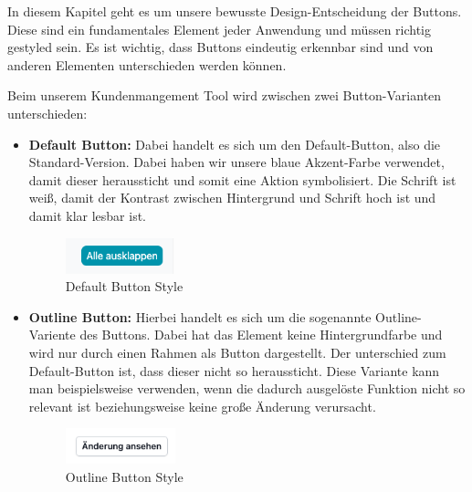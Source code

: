 In diesem Kapitel geht es um unsere bewusste Design-Entscheidung der Buttons. Diese sind ein fundamentales Element jeder Anwendung und müssen richtig gestyled sein. Es ist wichtig, dass Buttons eindeutig erkennbar sind und von anderen Elementen unterschieden werden können.

Beim unserem Kundenmangement Tool wird zwischen zwei Button-Varianten unterschieden:

\begin{itemize}
    \item \textbf{Default Button:}
        \newline
        Dabei handelt es sich um den Default-Button, also die Standard-Version. Dabei haben wir unsere blaue Akzent-Farbe verwendet, damit dieser heraussticht und somit eine Aktion symbolisiert. Die Schrift ist weiß, damit der Kontrast zwischen Hintergrund und Schrift hoch ist und damit klar lesbar ist.
        \begin{figure}[h!]
            \centering
            \includegraphics[width=0.3\textwidth]{pics/button-default.png}
            \caption{Default Button Style}
            \label{fig:mesh1}
        \end{figure}

    \item \textbf{Outline Button:}
        \newline
        Hierbei handelt es sich um die sogenannte Outline-Variente des Buttons. Dabei hat das Element keine Hintergrundfarbe und wird nur durch einen Rahmen als Button dargestellt. Der unterschied zum Default-Button ist, dass dieser nicht so heraussticht. Diese Variante kann man beispielsweise verwenden, wenn die dadurch ausgelöste Funktion nicht so relevant ist beziehungsweise keine große Änderung verursacht.
        \begin{figure}[h!]
            \centering
            \includegraphics[width=0.3\textwidth]{pics/button-outline.png}
            \caption{Outline Button Style}
            \label{fig:mesh1}
        \end{figure}
\end{itemize}